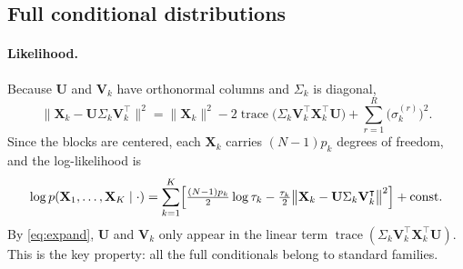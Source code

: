 \documentclass[11pt]{article}
\DeclareMathOperator{\trace}{\mathrm{trace}}
\newcommand{\X}{\mathbf{X}}
\newcommand{\U}{\mathbf{U}}
\newcommand{\V}{\mathbf{V}}
\begin{document}
\subsection{Full conditional distributions}

\paragraph{Likelihood.} Because $\U$ and $\V_k$ have orthonormal columns and $\Sigma_k$ is diagonal,
\begin{equation}
  \bigl\|\X_k-\U\Sigma_k\V_k^\intercal\bigr\|^2
  =\|\X_k\|^2-2\trace\bigl(\Sigma_k\V_k^\intercal\X_k^\intercal\U\bigr)+\sum_{r=1}^R\bigl(\sigma_k^{(r)}\bigr)^2 .
  \label{eq:expand}
\end{equation}
Since the blocks are centered, each $\X_k$ carries $(N-1)p_k$ degrees of freedom, and the log-likelihood is
\[
  \log p(\X_1,\ldots,\X_K\mid\cdot)=\sum_{k=1}^K\Bigl[\tfrac{(N-1)p_k}{2}\log\tau_k
  -\tfrac{\tau_k}{2}\bigl\|\X_k-\U\Sigma_k\V_k^\intercal\bigr\|^2\Bigr]+\text{const}.
\]
By \eqref{eq:expand}, $\U$ and $\V_k$ only appear in the linear term $\trace(\Sigma_k\V_k^\intercal\X_k^\intercal\U)$.
This is the key property: all the full conditionals belong to standard families.
\end{document}
